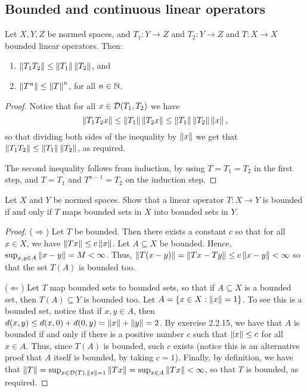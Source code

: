 \subsection{Bounded and continuous linear operators}


\begin{exercise}{1}
Let $X,Y,Z$ be normed spaces, and $T_1:Y\to Z$ and $T_2:Y\to Z$ and $T:X\to X$ bounded linear operators. Then:
\begin{enumerate}
    \item $\left\lVert T_1T_2\right\rVert\leq\left\lVert T_1\right\rVert\left\lVert T_2\right\rVert$, and
    \item $\left\lVert T^n\right\rVert\leq \left\lVert T\right\rVert^n$, for all $n\in\mathbb{N}$.
\end{enumerate}
\end{exercise}
\begin{proof}
Notice that for all $x\in\mathcal{D}(T_1,T_2)$ we have
\[
\left\lVert T_1T_2x\right\rVert\leq\left\lVert T_1\right\rVert\left\lVert T_2x\right\rVert\leq\left\lVert T_1\right\rVert\left\lVert T_2\right\rVert\left\lVert x\right\rVert,
\]
so that dividing both sides of the inequality by $\left\lVert x\right\rVert$ we get that $\left\lVert T_1T_2\right\rVert\leq\left\lVert T_1\right\rVert\left\lVert T_2\right\rVert$, as required.

The second inequality follows from induction, by using $T=T_1=T_2$ in the first step, and $T=T_1$ and $T^{n-1}=T_2$ on the induction step.
\end{proof}

\begin{exercise}{2}
Let $X$ and $Y$ be normed spaces. 
Show that a linear operator $T:X\to Y$ is bounded if and only if $T$ maps bounded sets in $X$ into bounded sets in $Y$.
\end{exercise}
\begin{proof}
($\Rightarrow$) Let $T$ be bounded. Then there exists a constant $c$ so that for all $x\in X$, we have $\left\lVert Tx\right\rVert\leq c\left\lVert x\right\rVert$. Let $A\subseteq X$ be bounded. Hence, $\sup_{x,y\in A}\left\lVert x-y\right\rVert=M<\infty$. Thus, $\left\lVert T(x-y)\right\rVert=\left\lVert Tx-Ty\right\rVert\leq c\left\lVert x-y\right\rVert<\infty$ so that the set $T(A)$ is bounded too.

($\Leftarrow$) Let $T$ map bounded sets to bounded sets, so that if $A\subseteq X$ is a bounded set, then $T(A)\subseteq Y$ is bounded too. Let $A=\{x\in X:\left\lVert x\right\rVert=1\}$. To see this is a bounded set, notice that if $x,y\in A$, then $d(x,y)\leq d(x,0)+d(0,y) =\left\lVert x\right\rVert+\left\lVert y\right\rVert=2$. By exercise 2.2.15, we have that $A$ is bounded if and only if there is a positive number $c$ such that $\left\lVert x\right\rVert\leq c$ for all $x\in A$. Thus, since $T(A)$ is bounded, such $c$ exists (notice this is an alternative proof that $A$ itself is bounded, by taking $c=1$). Finally, by definition, we have that $\left\lVert T\right\rVert =\sup_{x\in\mathcal{D}(T),\left\lVert x\right\rVert=1}\left\lVert Tx\right\rVert =\sup_{x\in A}\left\lVert Tx\right\rVert<\infty$, so that $T$ is bounded, as required.
\end{proof}

